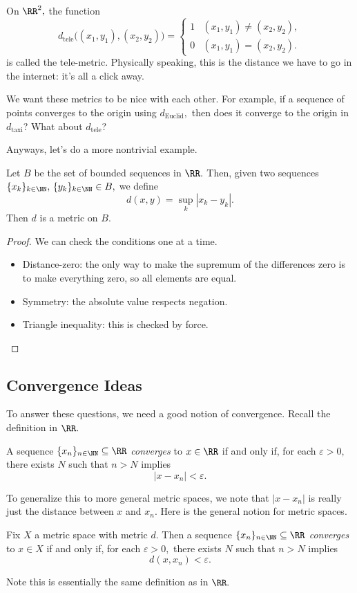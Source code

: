 \begin{example}
    On $\RR^2,$ the function
    \[d_{\text{tele}}\big((x_1,y_1),(x_2,y_2)\big)=\begin{cases}
        1 & (x_1,y_1)\ne(x_2,y_2), \\
        0 & (x_1,y_1)=(x_2,y_2).
    \end{cases}\]
    is called the tele-metric. Physically speaking, this is the distance we have to go in the internet: it's all a click away.
\end{example}
We want these metrics to be nice with each other. For example, if a sequence of points converges to the origin using $d_{\text{Euclid}},$ then does it converge to the origin in $d_{\text{taxi}}$? What about $d_{\text{tele}}$?

Anyways, let's do a more nontrivial example.
\begin{exercise}[Ross 13.3]
    Let $B$ be the set of bounded sequences in $\RR.$ Then, given two sequences $\{x_k\}_{k\in\NN},\,\{y_k\}_{k\in\NN}\in B,$ we define
    \[d(x,y)=\sup_k|x_k-y_k|.\]
    Then $d$ is a metric on $B.$
\end{exercise}
\begin{proof}
    We can check the conditions one at a time.
    \begin{itemize}
        \item Distance-zero: the only way to make the supremum of the differences zero is to make everything zero, so all elements are equal.
        \item Symmetry: the absolute value respects negation.
        \item Triangle inequality: this is checked by force.
        \qedhere
    \end{itemize}
\end{proof}

\subsection{Convergence Ideas}
To answer these questions, we need a good notion of convergence. Recall the definition in $\RR.$
\begin{definition}
    A sequence $\{x_n\}_{n\in\NN}\subseteq\RR$ \textit{converges} to $x\in\RR$ if and only if, for each $\varepsilon>0,$ there exists $N$ such that $n>N$ implies
    \[|x-x_n|<\varepsilon.\]
\end{definition}
To generalize this to more general metric spaces, we note that $|x-x_n|$ is really just the distance between $x$ and $x_n.$ Here is the general notion for metric spaces.
\begin{definition}
    Fix $X$ a metric space with metric $d.$ Then a sequence $\{x_n\}_{n\in\NN}\subseteq\RR$ \textit{converges} to $x\in X$ if and only if, for each $\varepsilon>0,$ there exists $N$ such that $n>N$ implies
    \[d(x,x_n)<\varepsilon.\]
\end{definition}
Note this is essentially the same definition as in $\RR.$

